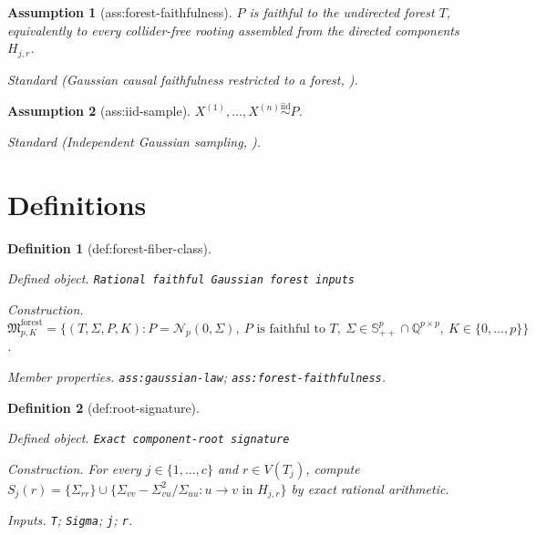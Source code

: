 \documentclass{article}
\newtheorem{assumption}{Assumption}
\newtheorem{definition}{Definition}
\begin{document}
\begin{assumption}[ass:forest-faithfulness]\label{ass:forest-faithfulness}
\(P\) is faithful to the undirected forest \(T\), equivalently to every collider-free rooting assembled from the directed components \(H_{j,r}\).
\par\smallskip\noindent\emph{Standard} (Gaussian causal faithfulness restricted to a forest, \cite{BoegeKubjasMisraSolus2026}).
\end{assumption}

\begin{assumption}[ass:iid-sample]\label{ass:iid-sample}
\(X^{(1)},\ldots,X^{(n)}\stackrel{\mathrm{iid}}{\sim}P\).
\par\smallskip\noindent\emph{Standard} (Independent Gaussian sampling, \cite{StriederDrton2023}).
\end{assumption}

\section{Definitions}

\begin{definition}[def:forest-fiber-class]\label{def:forest-fiber-class}
\par\smallskip\noindent\emph{Defined object.} \texttt{Rational faithful Gaussian forest inputs}
\par\smallskip\noindent\emph{Construction.} \(\mathfrak M_{p,K}^{\mathrm{forest}}=\{(T,\Sigma,P,K):P=\mathcal N_p(0,\Sigma),\ P\text{ is faithful to }T,\ \Sigma\in\mathbb S_{++}^{p}\cap\mathbb Q^{p\times p},\ K\in\{0,\ldots,p\}\}\).
\par\smallskip\noindent\emph{Member properties.} \texttt{ass:\allowbreak{}gaussian-\allowbreak{}law}; \texttt{ass:\allowbreak{}forest-\allowbreak{}faithfulness}.
\end{definition}

\begin{definition}[def:root-signature]\label{def:root-signature}
\par\smallskip\noindent\emph{Defined object.} \texttt{Exact component-\allowbreak{}root signature}
\par\smallskip\noindent\emph{Construction.} For every \(j\in\{1,\ldots,c\}\) and \(r\in V(T_j)\), compute \(S_j(r)=\{\Sigma_{rr}\}\cup\{\Sigma_{vv}-\Sigma_{vu}^{2}/\Sigma_{uu}:u\to v\text{ in }H_{j,r}\}\) by exact rational arithmetic.
\par\smallskip\noindent\emph{Inputs.} \texttt{T}; \texttt{Sigma}; \texttt{j}; \texttt{r}.
\end{definition}
\end{document}
